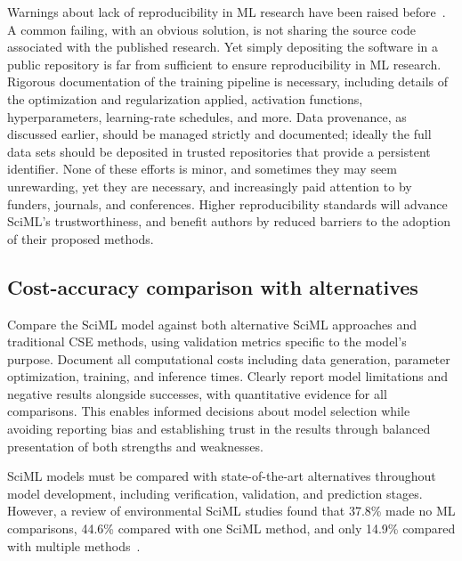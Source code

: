 Warnings about lack of reproducibility in ML research have been raised before~\cite{hutson2018reproducibility,haibe2020transparency}.
A common failing, with an obvious solution, is not sharing the source code associated with the published research. 
Yet simply depositing the software in a public repository is far from sufficient to ensure reproducibility in ML research. 
Rigorous documentation of the training pipeline is necessary, including details of the optimization and regularization applied, activation functions, hyperparameters, learning-rate schedules, and more.
Data provenance, as discussed earlier, should be managed strictly and documented; ideally the full data sets should be deposited in trusted repositories that provide a persistent identifier. 
None of these efforts is minor, and sometimes they may seem unrewarding, yet they are necessary, and increasingly paid attention to by funders, journals, and conferences.
Higher reproducibility standards will advance SciML's trustworthiness, and benefit authors by reduced barriers to the adoption of their proposed methods. 




\subsection{Cost-accuracy comparison with alternatives}

\begin{essrec}
Compare the SciML model against both alternative SciML approaches and traditional CSE methods, using validation metrics specific to the model's purpose. Document all computational costs including data generation, parameter optimization, training, and inference times. Clearly report model limitations and negative results alongside successes, with quantitative evidence for all comparisons. This enables informed decisions about model selection while avoiding reporting bias and establishing trust in the results through balanced presentation of both strengths and weaknesses.
\end{essrec}

SciML models must be compared with state-of-the-art alternatives throughout model development, including verification, validation, and prediction stages. However, a review of environmental SciML studies found that 37.8\% made no ML comparisons, 44.6\% compared with one SciML method, and only 14.9\% compared with multiple methods~\cite{Zhu_YR_EST_2023}.

